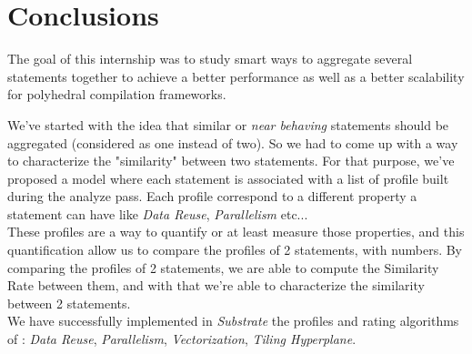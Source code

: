 \documentclass[paper=a4, fontsize=11.5pt]{scrartcl}
\numberwithin{equation}{section}        %
\numberwithin{figure}{section}          %
\numberwithin{table}{section}               %
\begin{document}

    
\section{Conclusions}
The goal of this internship was to study smart ways to aggregate several statements
together to achieve a better performance as well as a better scalability for polyhedral
compilation frameworks.

\bigskip

We've started with the idea that similar or \textit{near behaving} statements should be
aggregated (considered as one instead of two). So we had to come up with a way to characterize
the "similarity" between two statements. For that purpose, we've proposed a model where
each statement is associated with a list of profile built during the analyze pass.
Each profile correspond to a different property a statement can have like \textit{Data Reuse},
\textit{Parallelism} etc...\\
These profiles are a way to quantify or at least measure those properties, and this quantification
allow us to compare the profiles of 2 statements, with numbers. By comparing the profiles
of 2 statements, we are able to compute the Similarity Rate between them, and with that we're
able to characterize the similarity between 2 statements.\\
We have successfully implemented in \textit{Substrate} the profiles and rating algorithms of :
\textit{Data Reuse}, \textit{Parallelism}, \textit{Vectorization}, \textit{Tiling Hyperplane}.
\end{document}
